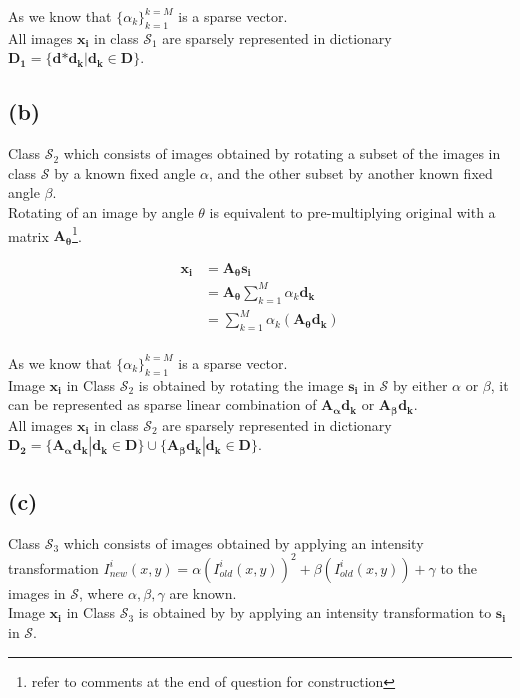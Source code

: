 \documentclass[fleqn, 11pt]{article}
\newcommand{\bs}[1]{\boldsymbol{#1}}
\begin{document}
As we know that $\{\alpha_k\}_{k=1}^{k=M}$ is a sparse vector. \\
All images $\bs{x_i}$ in class $\mathcal{S}_1$ are sparsely represented in dictionary $\bs{D_1} = \{\bs{d} \bs{*} \bs{d_k} | \bs{d_k} \in \bs{D}\}$. \\

\medskip

\subsection*{(b)}
Class $\mathcal{S}_2$ which consists of images obtained by rotating a subset of the images in class $\mathcal{S}$ by a known fixed angle $\alpha$, and the other subset by another known fixed angle $\beta$. \\
Rotating of an image by angle $\theta$ is equivalent to pre-multiplying original with a matrix $\bs{A_\theta}$\footnote{refer to comments at the end of question for construction}.

\begin{equation*}
    \begin{aligned}
        \bs{x_i} &= \bs{A_\theta} \bs{s_i} \\
            &= \bs{A_\theta} \sum_{k=1}^{M} \alpha_k \bs{d_k} \\
            &= \sum_{k=1}^{M} \alpha_k (\bs{A_\theta} \bs{d_k}) \\
    \end{aligned}
\end{equation*}

As we know that $\{\alpha_k\}_{k=1}^{k=M}$ is a sparse vector. \\
Image $\bs{x_i}$ in Class $\mathcal{S}_2$ is obtained by rotating the image $\bs{s_i}$ in $\mathcal{S}$ by either $\alpha$ or $\beta$, it can be represented as sparse linear combination of $\bs{A_\alpha} \bs{d_k}$ or $\bs{A_\beta} \bs{d_k}$. \\
All images $\bs{x_i}$ in class $\mathcal{S}_2$ are sparsely represented in dictionary $\bs{D_2} = \{\bs{A_\alpha} \bs{d_k} | \bs{d_k} \in \bs{D}\} \cup \{\bs{A_\beta} \bs{d_k} | \bs{d_k} \in \bs{D}\}$. \\

\newpage

\subsection*{(c)}
Class $\mathcal{S}_3$ which consists of images obtained by applying an intensity transformation $I^i_{new}(x,y) = \alpha (I^i_{old}(x,y))^2 + \beta (I^i_{old}(x,y)) + \gamma$ to the images in $\mathcal{S}$, where $\alpha,\beta,\gamma$ are known. \\
Image $\bs{x_i}$ in Class $\mathcal{S}_3$ is obtained by by applying an intensity transformation to $\bs{s_i}$ in $\mathcal{S}$.
\end{document}
